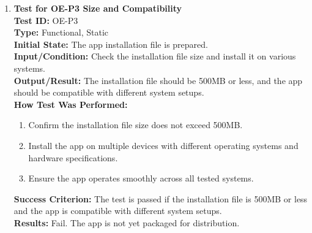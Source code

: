 \documentclass[12pt, titlepage]{article}
\begin{document}
\begin{enumerate}
    \item \textbf{Test for OE-P3 Size and Compatibility} \\
      \newline
      \textbf{Test ID:} OE-P3 \\
      \textbf{Type:} Functional, Static \\
      \textbf{Initial State:} The app installation file is prepared. \\
      \textbf{Input/Condition:} Check the installation file size and install it on various systems. \\
      \textbf{Output/Result:} The installation file should be 500MB or less, and the app should be compatible with different 
      system setups. \\
      \textbf{How Test Was Performed:}
      \begin{enumerate}
          \item Confirm the installation file size does not exceed 500MB.
          \item Install the app on multiple devices with different operating systems and hardware specifications.
          \item Ensure the app operates smoothly across all tested systems.
      \end{enumerate}
      \textbf{Success Criterion:} The test is passed if the installation file is 500MB or less and the app is compatible with different system setups.\\
      \textbf{Results:} Fail. The app is not yet packaged for distribution.\\


\end{enumerate}
\end{document}
